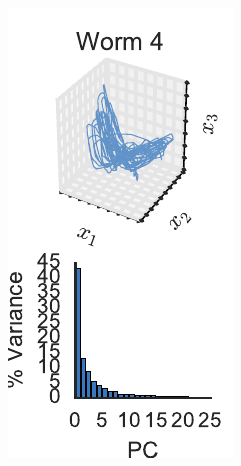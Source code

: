 \documentclass{article}
\begin{document}
\begin{figure}[t]
\begin{subfigure}[b]{.19\linewidth}
    \includegraphics[width=\textwidth]{pca_trajectory_worm3.pdf}
  \end{subfigure}
  \begin{subfigure}[b]{.19\linewidth}

\end{subfigure}
\end{figure}
\end{document}
